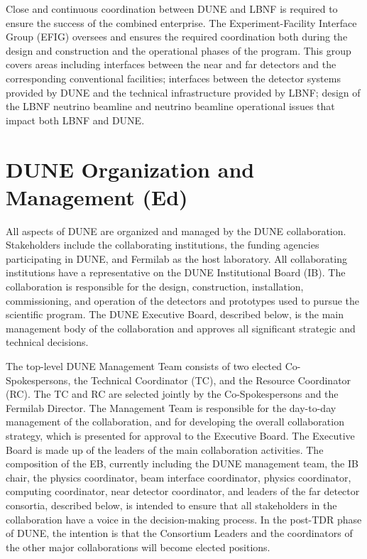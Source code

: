\begin{itemize}
Close and continuous coordination between DUNE and LBNF is required to ensure the success of the combined enterprise. The Experiment-Facility Interface Group (EFIG)  oversees and ensures the required coordination both during the design and construction and the operational phases of the program. This group covers areas including interfaces between the near and far detectors and the corresponding conventional facilities; interfaces between the detector systems provided by DUNE and the technical infrastructure provided by LBNF; design of the LBNF neutrino beamline and neutrino beamline operational issues that impact both LBNF and DUNE.  

\end{itemize}





\section{DUNE Organization and Management (Ed)}

All aspects of DUNE are organized and managed by the DUNE collaboration.  Stakeholders include the collaborating institutions, the funding agencies participating in DUNE, and Fermilab as the host laboratory.  All collaborating institutions have a representative on the DUNE Institutional Board (IB). The collaboration is responsible for the design, construction, installation, commissioning, and operation of the detectors and prototypes used to pursue the scientific program. The DUNE Executive Board, described below, is the main management body of the collaboration and approves all significant strategic and technical decisions.

The top-level DUNE Management Team consists of two elected Co-Spokespersons, the Technical Coordinator (TC), and the Resource Coordinator (RC). The TC and RC are selected jointly by the Co-Spokespersons and the Fermilab Director. The Management Team is responsible for the day-to-day management of the collaboration, and for developing the overall collaboration strategy, which is presented for approval to the Executive Board. The Executive Board is made up of the leaders of the main collaboration activities. The composition of the EB, currently including the DUNE management team, the IB chair, the physics coordinator, beam interface coordinator, physics coordinator, computing coordinator, near detector coordinator, and leaders of the far detector consortia, described below, is intended to ensure
that all stakeholders in the collaboration have a voice in the decision-making process. 
In the post-TDR phase of DUNE, the intention is that the Consortium Leaders and the coordinators of the other major collaborations will become elected positions.

